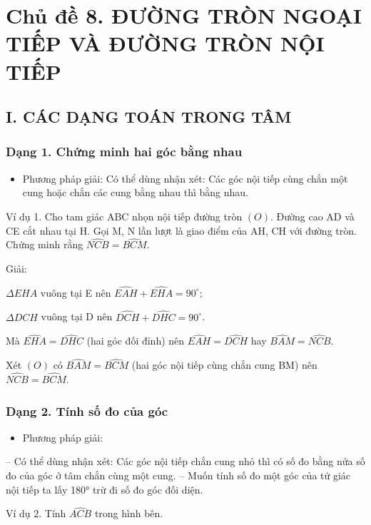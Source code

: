 \documentclass[%
    fontsize=12pt,%
    chapterprefix=false,%
    open=right,%
    twoside=false,%
    numbers=noenddot,%
    headings=optiontohead,%
    final,%
    DIV=15,%
    parskip=half %
]{scrbook}
\begin{document}
\section{Chủ đề 8. ĐƯỜNG TRÒN NGOẠI TIẾP VÀ ĐƯỜNG TRÒN NỘI TIẾP}
\subsection{I. CÁC DẠNG TOÁN TRONG TÂM}
\subsubsection{Dạng 1. Chứng minh hai góc bằng nhau}

\begin{itemize}
  \item Phương pháp giải: Có thể dùng nhận xét: Các góc nội tiếp cùng chắn một cung hoặc chắn các cung bằng nhau thì bằng nhau.
\end{itemize}

Ví dụ 1. Cho tam giác ABC nhọn nội tiếp đường tròn $(O)$. Đường cao AD và CE cắt nhau tại H. Gọi M, N lần lượt là giao điểm của AH, CH với đường tròn. Chứng minh rằng $ \widehat{NCB} = \widehat{BCM} $.

Giải:

$ \Delta EHA $ vuông tại E nên $ \widehat{EAH} + \widehat{EHA} = 90^\circ $;

$ \Delta DCH $ vuông tại D nên $ \widehat{DCH} + \widehat{DHC} = 90^\circ $.

Mà $ \widehat{EHA} = \widehat{DHC} $ (hai góc đối đỉnh) nên $ \widehat{EAH} = \widehat{DCH} $ hay $ \widehat{BAM} = \widehat{NCB} $.

Xét $(O)$ có $ \widehat{BAM} = \widehat{BCM} $ (hai góc nội tiếp cùng chắn cung BM) nên $ \widehat{NCB} = \widehat{BCM} $.
\subsubsection{Dạng 2. Tính số đo của góc}

\begin{itemize}
  \item Phương pháp giải:
\end{itemize}

-- Có thể dùng nhận xét: Các góc nội tiếp chắn cung nhỏ thì có số đo bằng nửa số đo của góc ở tâm chắn cùng một cung. -- Muốn tính số đo một góc của tứ giác nội tiếp ta lấy 180° trừ đi số đo góc đối diện.

Ví dụ 2. Tính $ \widehat{ACB} $ trong hình bên.
\end{document}
